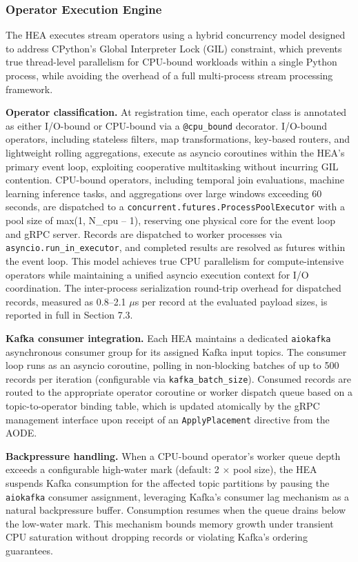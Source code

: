 \documentclass[preprint,review,12pt]{elsarticle}
\begin{document}
\subsubsection{Operator Execution Engine}\label{operator-execution-engine}

The HEA executes stream operators using a hybrid concurrency model designed to address CPython's Global Interpreter Lock (GIL) constraint, which prevents true thread-level parallelism for CPU-bound workloads within a single Python process, while avoiding the overhead of a full multi-process stream processing framework.

\textbf{Operator classification.} At registration time, each operator class is annotated as either I/O-bound or CPU-bound via a \texttt{@cpu\_bound} decorator. I/O-bound operators, including stateless filters, map transformations, key-based routers, and lightweight rolling aggregations, execute as asyncio coroutines within the HEA's primary event loop, exploiting cooperative multitasking without incurring GIL contention. CPU-bound operators, including temporal join evaluations, machine learning inference tasks, and aggregations over large windows exceeding 60 seconds, are dispatched to a \texttt{concurrent.futures.ProcessPoolExecutor} with a pool size of max(1, N\_cpu -- 1), reserving one physical core for the event loop and gRPC server. Records are dispatched to worker processes via \texttt{asyncio.run\_in\_executor}, and completed results are resolved as futures within the event loop. This model achieves true CPU parallelism for compute-intensive operators while maintaining a unified asyncio execution context for I/O coordination. The inter-process serialization round-trip overhead for dispatched records, measured as 0.8--2.1 $\mu$s per record at the evaluated payload sizes, is reported in full in Section 7.3.

\textbf{Kafka consumer integration.} Each HEA maintains a dedicated \texttt{aiokafka} \cite{aiokafka2024} asynchronous consumer group for its assigned Kafka input topics. The consumer loop runs as an asyncio coroutine, polling in non-blocking batches of up to 500 records per iteration (configurable via \texttt{kafka\_batch\_size}). Consumed records are routed to the appropriate operator coroutine or worker dispatch queue based on a topic-to-operator binding table, which is updated atomically by the gRPC management interface upon receipt of an \texttt{ApplyPlacement} directive from the AODE.

\textbf{Backpressure handling.} When a CPU-bound operator's worker queue depth exceeds a configurable high-water mark (default: 2 $\times$ pool size), the HEA suspends Kafka consumption for the affected topic partitions by pausing the \texttt{aiokafka} consumer assignment, leveraging Kafka's consumer lag mechanism as a natural backpressure buffer. Consumption resumes when the queue drains below the low-water mark. This mechanism bounds memory growth under transient CPU saturation without dropping records or violating Kafka's ordering guarantees.
\end{document}
